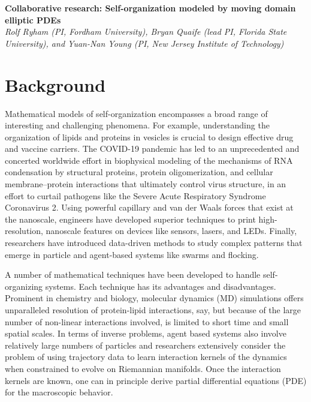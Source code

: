 \noindent
{\bf Collaborative research: Self-organization modeled by moving domain
elliptic PDEs} \\
{\em Rolf Ryham (PI, Fordham University),
Bryan Quaife (lead PI, Florida State University), and
Yuan-Nan Young (PI, New Jersey Institute of Technology)}

\section{Background}
\label{sec:background}

Mathematical models of self-organization encompasses a broad range of
interesting and challenging phenomena. For example, understanding the
organization of lipids and proteins in vesicles is crucial to design
effective drug and vaccine carriers. The COVID-19 pandemic has led to an
unprecedented and concerted worldwide effort in biophysical modeling of
the mechanisms of RNA condensation by structural proteins, protein
oligomerization, and cellular membrane–protein interactions that
ultimately control virus structure, in an effort to curtail pathogens
like the Severe Acute Respiratory Syndrome Coronavirus 2. Using powerful
capillary and van der Waals forces that exist at the nanoscale,
engineers have developed superior techniques to print high-resolution,
nanoscale features on devices like sensors, lasers, and LEDs. Finally,
researchers have introduced data-driven methods to study complex
patterns that emerge in particle and agent-based systems like swarms and
flocking.

A number of mathematical techniques have been developed to handle
self-organizing systems. Each technique has its advantages and
disadvantages. Prominent in chemistry and biology, molecular dynamics
(MD) simulations offers unparalleled resolution of protein-lipid
interactions, say, but because of the large number of non-linear
interactions involved, is limited to short time and small spatial
scales. In terms of inverse problems, agent based systems also involve
relatively large numbers of particles and researchers extensively
consider the problem of using trajectory data to learn interaction
kernels of the dynamics when constrained to evolve on Riemannian
manifolds. Once the interaction kernels are known, one can in principle
derive partial differential equations (PDE) for the macroscopic
behavior. 


